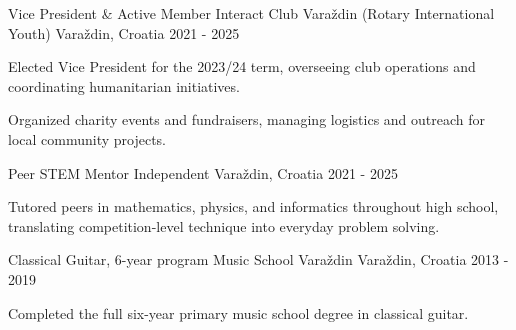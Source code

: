 %

\begin{cventries}

  \cventry
    {Vice President \& Active Member} %
    {Interact Club Varaždin (Rotary International Youth)} %
    {Varaždin, Croatia} %
    {2021 - 2025} %
    {
      \begin{cvitems}
        \item {Elected Vice President for the 2023/24 term, overseeing club operations and coordinating humanitarian initiatives.}
        \item {Organized charity events and fundraisers, managing logistics and outreach for local community projects.}
      \end{cvitems}
      \vspace{4mm}
    }

  \cventry
    {Peer STEM Mentor} %
    {Independent} %
    {Varaždin, Croatia} %
    {2021 - 2025} %
    {
      \begin{cvitems}
        \item {Tutored peers in mathematics, physics, and informatics throughout high school, translating competition-level technique into everyday problem solving.}
      \end{cvitems}
      \vspace{4mm}
    }

  \cventry
    {Classical Guitar, 6-year program} %
    {Music School Varaždin} %
    {Varaždin, Croatia} %
    {2013 - 2019} %
    {
      \begin{cvitems}
        \item {Completed the full six-year primary music school degree in classical guitar.}
      \end{cvitems}
      \vspace{4mm}
    }

\end{cventries}
